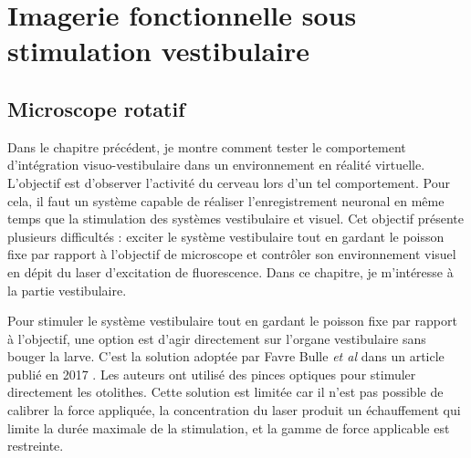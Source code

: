 \chapter{Imagerie fonctionnelle sous stimulation vestibulaire}\label{chapIII}




\section{Microscope rotatif}

Dans le chapitre précédent, je montre comment tester le comportement d'intégration visuo-vestibulaire dans un environnement en réalité virtuelle. L'objectif est d'observer l'activité du cerveau lors d'un tel comportement. Pour cela, il faut un système capable de réaliser l'enregistrement neuronal en même temps que la stimulation des systèmes vestibulaire et visuel. Cet objectif présente plusieurs difficultés : exciter le système vestibulaire tout en gardant le poisson fixe par rapport à l'objectif de microscope et contrôler son environnement visuel en dépit du laser d'excitation de fluorescence. Dans ce chapitre, je m'intéresse à la partie vestibulaire.

Pour stimuler le système vestibulaire tout en gardant le poisson fixe par rapport à l'objectif, une option est d'agir directement sur l'organe vestibulaire sans bouger la larve. C'est la solution adoptée par Favre Bulle \emph{et al} dans un article publié en 2017 \cite{favre-bulle_optical_2017}. Les auteurs ont utilisé des pinces optiques pour stimuler directement les otolithes. Cette solution est limitée car il n'est pas possible de calibrer la force appliquée, la concentration du laser produit un échauffement qui limite la durée maximale de la stimulation, et la gamme de force applicable est restreinte.

